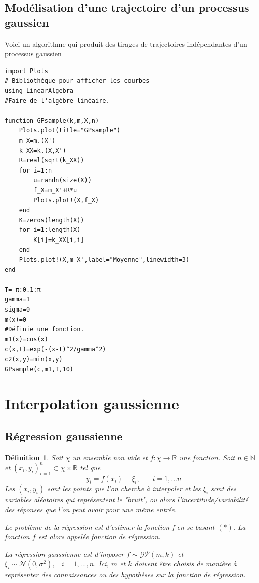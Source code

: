 \documentclass[a4paper,12pt]{article}
\newtheorem{definition}{Définition}
\begin{document}
\subsection{Modélisation d'une trajectoire d'un processus gaussien}

Voici un algorithme qui produit des tirages de trajectoires indépendantes d'un processus gaussien



\begin{verbatim}
import Plots 
# Bibliothèque pour afficher les courbes
using LinearAlgebra 
#Faire de l'algèbre linéaire.

function GPsample(k,m,X,n)
    Plots.plot(title="GPsample")
    m_X=m.(X')
    k_XX=k.(X,X')
    R=real(sqrt(k_XX))
    for i=1:n
        u=randn(size(X))
        f_X=m_X'+R*u
        Plots.plot!(X,f_X)
    end
    K=zeros(length(X))
    for i=1:length(X)
        K[i]=k_XX[i,i]
    end
    Plots.plot!(X,m_X',label="Moyenne",linewidth=3)
end

T=-π:0.1:π
gamma=1
sigma=0
m(x)=0 
#Définie une fonction.
m1(x)=cos(x)
c(x,t)=exp(-(x-t)^2/gamma^2)
c2(x,y)=min(x,y)
GPsample(c,m1,T,10)

\end{verbatim}


\section{Interpolation gaussienne}

\subsection{Régression gaussienne}

\begin{definition}
    Soit $\chi$ un ensemble non vide et $f:\chi\to\mathbb{R}$ une fonction.
    Soit $n\in\mathbb{N}$ et $(x_i,y_i)_{i=1}^n\subset\chi\times\mathbb{R}$ tel que
    $$ ~~ y_i=f(x_i)+\xi_i,~~~~~~~~i=1,...n$$ 
    Les $(x_i,y_i)$ sont les points que l'on cherche à interpoler
    et les $\xi_i$ sont des variables aléatoires qui représentent le "bruit", 
    ou alors l'incertitude/variabilité des réponses que l'on peut avoir pour une même entrée.

    Le problème de la régression est d'estimer la fonction f en se basant $(*)$. 
    La fonction $f$ est alors appelée fonction de régression.

    La régression gaussienne est d'imposer $f\sim\mathcal{GP}(m,k)$ et $\xi_i\sim\mathcal{N}(0,\sigma^2),~~~~i=1,...,n$. 
    Ici, $m$ et $k$ doivent être choisis de manière à représenter des connaissances 
    ou des hypothèses sur la fonction de régression.
\end{definition}
\end{document}

